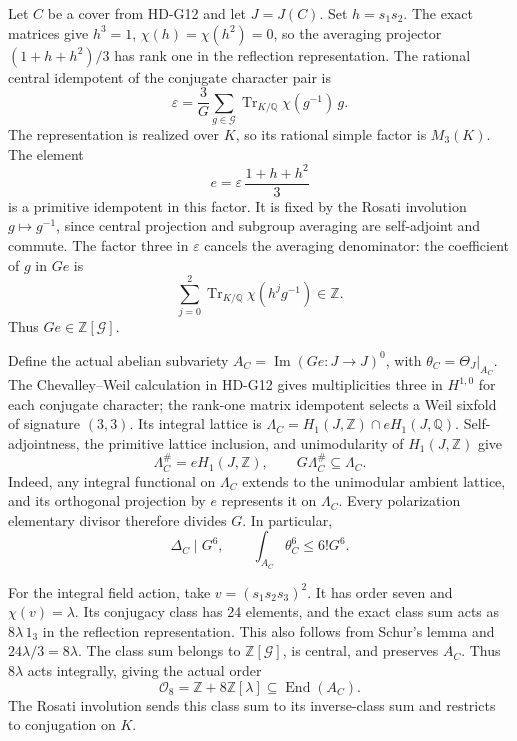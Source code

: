 Let \(C\) be a cover from HD-G12 and let \(J=J(C)\).
Set \(h=s_1s_2\). The exact matrices give \(h^3=1\),
\(\chi(h)=\chi(h^2)=0\), so the averaging projector
\((1+h+h^2)/3\) has rank one in the reflection representation.
The rational central idempotent of the conjugate character pair is
\[
 \varepsilon=\frac3G\sum_{g\in\mathcal G}
       \operatorname{Tr}_{K/\mathbb Q}\chi(g^{-1})\,g.
\]
The representation is realized over \(K\), so its rational simple
factor is \(M_3(K)\). The element
\[
 e=\varepsilon\,\frac{1+h+h^2}{3}                           \tag{S13.1}
\]
is a primitive idempotent in this factor. It is fixed by the
Rosati involution \(g\mapsto g^{-1}\), since central projection and
subgroup averaging are self-adjoint and commute.
The factor three in \(\varepsilon\) cancels the averaging
denominator: the coefficient of \(g\) in \(Ge\) is
\[
 \sum_{j=0}^2\operatorname{Tr}_{K/\mathbb Q}
                       \chi(h^j g^{-1})\in\mathbb Z.       \tag{S13.2}
\]
Thus \(Ge\in\mathbb Z[\mathcal G]\).

Define the actual abelian subvariety
\(A_C=\operatorname{Im}(Ge:J\to J)^0\), with
\(\theta_C=\Theta_J|_{A_C}\).
The Chevalley--Weil calculation in HD-G12 gives multiplicities
three in \(H^{1,0}\) for each conjugate character; the rank-one
matrix idempotent selects a Weil sixfold of signature \((3,3)\).
Its integral lattice is
\(\Lambda_C=H_1(J,\mathbb Z)\cap eH_1(J,\mathbb Q)\).
Self-adjointness, the primitive lattice inclusion, and
unimodularity of \(H_1(J,\mathbb Z)\) give
\[
 \Lambda_C^\#=eH_1(J,\mathbb Z),\qquad
 G\Lambda_C^\#\subseteq\Lambda_C.
\]
Indeed, any integral functional on \(\Lambda_C\) extends to the
unimodular ambient lattice, and its orthogonal projection by \(e\)
represents it on \(\Lambda_C\). Every polarization elementary
divisor therefore divides \(G\). In particular,
\[
 \Delta_C\mid G^6,\qquad \int_{A_C}\theta_C^6\le6!G^6.       \tag{S13.3}
\]

For the integral field action, take \(v=(s_1s_2s_3)^2\).
It has order seven and \(\chi(v)=\lambda\).
Its conjugacy class has 24 elements, and the exact class sum acts
as \(8\lambda\,1_3\) in the reflection representation. This also
follows from Schur's lemma and \(24\lambda/3=8\lambda\).
The class sum belongs to \(\mathbb Z[\mathcal G]\), is central,
and preserves \(A_C\). Thus \(8\lambda\) acts integrally, giving
the actual order
\[
 \mathcal O_8=\mathbb Z+8\mathbb Z[\lambda]
 \subseteq\operatorname{End}(A_C).                        \tag{S13.4}
\]
The Rosati involution sends this class sum to its inverse-class
sum and restricts to conjugation on \(K\).

